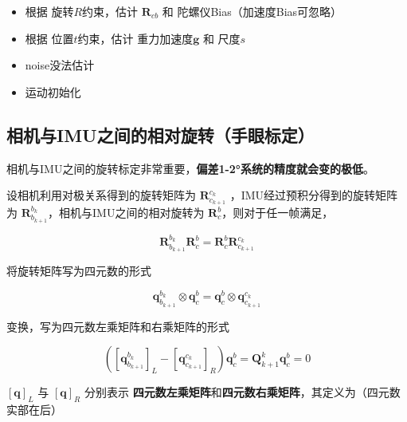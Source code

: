 \documentclass[12pt,a4paper]{article}
\begin{document}
\begin{itemize}
\item 根据 旋转$R$约束，估计 $\mathbf{R}_{cb}$ 和 陀螺仪Bias（加速度Bias可忽略）
\item 根据 位置$t$约束，估计 重力加速度$\mathbf{g}$ 和 尺度$s$
\item noise没法估计
\item 运动初始化
\end{itemize}

\subsection{相机与IMU之间的相对旋转（手眼标定）}

相机与IMU之间的旋转标定非常重要，\textbf{偏差1-2°系统的精度就会变的极低}\cite{xiaobuyi2018webnote}。

设相机利用对极关系得到的旋转矩阵为 $\mathbf{R}_{c_{k+1}}^{c_k}$ ，IMU经过预积分得到的旋转矩阵为 $\mathbf{R}_{b_{k+1}}^{b_{k}}$，相机与IMU之间的相对旋转为 $\mathbf{R}_{c}^{b}$，则对于任一帧满足，

\begin{equation}
\mathbf{R}^{b_{k}}_{b_{k+1}} \mathbf{R}^{b}_{c}
= \mathbf{R}^{b}_{c} \mathbf{R}^{c_{k}}_{c_{k+1}}
\end{equation}

将旋转矩阵写为四元数的形式

\begin{equation}
\mathbf{q}^{b_{k}}_{b_{k+1}} \otimes \mathbf{q}^{b}_{c}
= \mathbf{q}^{b}_{c} \otimes \mathbf{q}^{c_{k}}_{c_{k+1}}
\end{equation}

变换，写为四元数左乘矩阵和右乘矩阵的形式

\begin{equation}
({[\mathbf{q}^{b_{k}}_{b_{k+1}}]}_L - {[\mathbf{q}^{c_{k}}_{c_{k+1}}]}_R) \mathbf{q}^b_c
= \mathbf{Q}^k_{k+1} \mathbf{q}^b_c = 0
\end{equation}

$[\mathbf{q}]_L$ 与 $[\mathbf{q}]_R$ 分别表示 \textbf{四元数左乘矩阵}和\textbf{四元数右乘矩阵}，其定义为（四元数实部在后）
\end{document}

